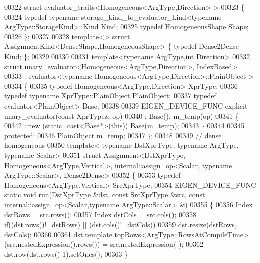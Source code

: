 \begin{DoxyCode}
00322 \textcolor{keyword}{struct }evaluator\_traits<Homogeneous<ArgType,Direction> >
00323 \{
00324   \textcolor{keyword}{typedef} \textcolor{keyword}{typename} storage\_kind\_to\_evaluator\_kind<typename ArgType::StorageKind>::Kind Kind;
00325   \textcolor{keyword}{typedef} HomogeneousShape Shape;  
00326 \};
00327 
00328 \textcolor{keyword}{template}<> \textcolor{keyword}{struct }AssignmentKind<DenseShape,HomogeneousShape> \{ \textcolor{keyword}{typedef} Dense2Dense Kind; \};
00329 
00330 
00331 \textcolor{keyword}{template}<\textcolor{keyword}{typename} ArgType,\textcolor{keywordtype}{int} Direction>
00332 \textcolor{keyword}{struct }unary\_evaluator<Homogeneous<ArgType,Direction>, IndexBased>
00333   : evaluator<typename Homogeneous<ArgType,Direction>::PlainObject >
00334 \{
00335   \textcolor{keyword}{typedef} Homogeneous<ArgType,Direction> XprType;
00336   \textcolor{keyword}{typedef} \textcolor{keyword}{typename} XprType::PlainObject PlainObject;
00337   \textcolor{keyword}{typedef} evaluator<PlainObject> Base;
00338 
00339   EIGEN\_DEVICE\_FUNC \textcolor{keyword}{explicit} unary\_evaluator(\textcolor{keyword}{const} XprType& op)
00340     : Base(), m\_temp(op)
00341   \{
00342     ::new (static\_cast<Base*>(\textcolor{keyword}{this})) Base(m\_temp);
00343   \}
00344 
00345 protected:
00346   PlainObject m\_temp;
00347 \};
00348 
00349 \textcolor{comment}{// dense = homogeneous}
00350 template< typename DstXprType, typename ArgType, typename Scalar>
00351 struct Assignment<DstXprType, Homogeneous<ArgType,\hyperlink{group__enums_ggad49a7b3738e273eb00932271b36127f7addca718e0564723df21d61b94b1198be}{Vertical}>, \hyperlink{namespaceinternal}{internal}::assign\_op<Scalar,
      typename ArgType::Scalar>, Dense2Dense>
00352 \{
00353   \textcolor{keyword}{typedef} Homogeneous<ArgType,Vertical> SrcXprType;
00354   EIGEN\_DEVICE\_FUNC \textcolor{keyword}{static} \textcolor{keywordtype}{void} run(DstXprType &dst, \textcolor{keyword}{const} SrcXprType &src, \textcolor{keyword}{const} 
      internal::assign\_op<Scalar,typename ArgType::Scalar> &)
00355   \{
00356     \hyperlink{namespace_eigen_a62e77e0933482dafde8fe197d9a2cfde}{Index} dstRows = src.rows();
00357     \hyperlink{namespace_eigen_a62e77e0933482dafde8fe197d9a2cfde}{Index} dstCols = src.cols();
00358     \textcolor{keywordflow}{if}((dst.rows()!=dstRows) || (dst.cols()!=dstCols))
00359       dst.resize(dstRows, dstCols);
00360 
00361     dst.template topRows<ArgType::RowsAtCompileTime>(src.nestedExpression().rows()) = src.nestedExpression(
      );
00362     dst.row(dst.rows()-1).setOnes();
00363   \}

\end{DoxyCode}
